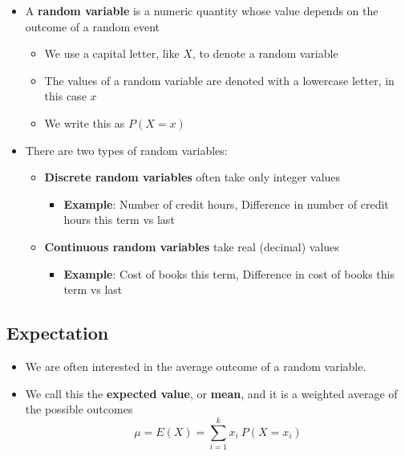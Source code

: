 \documentclass[
]{article}
\providecommand{\tightlist}{%
  \setlength{\itemsep}{0pt}\setlength{\parskip}{0pt}}
\begin{document}
\begin{itemize}
\tightlist
\item
  A \textbf{random variable} is a numeric quantity whose value depends
  on the outcome of a random event

  \begin{itemize}
  \tightlist
  \item
    We use a capital letter, like \(X\), to denote a random variable
  \item
    The values of a random variable are denoted with a lowercase letter,
    in this case \(x\)
  \item
    We write this as \(P(X = x)\)
  \end{itemize}
\item
  There are two types of random variables:

  \begin{itemize}
  \tightlist
  \item
    \textbf{Discrete random variables} often take only integer values

    \begin{itemize}
    \tightlist
    \item
      \textbf{Example}: Number of credit hours, Difference in number of
      credit hours this term vs last
    \end{itemize}
  \item
    \textbf{Continuous random variables} take real (decimal) values

    \begin{itemize}
    \tightlist
    \item
      \textbf{Example}: Cost of books this term, Difference in cost of
      books this term vs last
    \end{itemize}
  \end{itemize}
\end{itemize}

\hypertarget{expectation}{%
\subsection{Expectation}\label{expectation}}

\begin{itemize}
\tightlist
\item
  We are often interested in the average outcome of a random variable.
\item
  We call this the \textbf{expected value}, or \textbf{mean}, and it is
  a weighted average of the possible outcomes \[
  \mu = E(X) = \sum_{i = 1}^k x_i ~ P(X = x_i)
  \]
\end{itemize}
\end{document}
